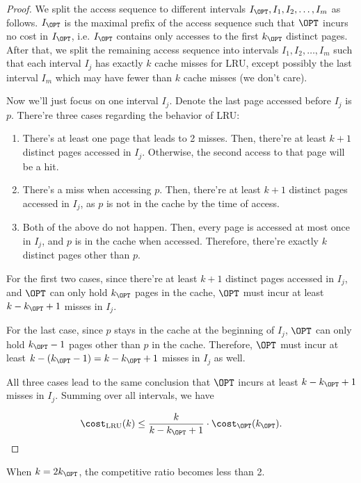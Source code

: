 \begin{proof}
	We split the access sequence to different intervals $I_\OPT, I_1, I_2, \ldots, I_m$ as follows. $I_\OPT$ is the maximal prefix of the access sequence such that $\OPT$ incurs no cost in $I_\OPT$, i.e. $I_\OPT$ contains only accesses to the first $k_{\OPT}$ distinct pages. After that, we split the remaining access sequence into intervals $I_1, I_2, \ldots, I_m$ such that each interval $I_j$ has exactly $k$ cache misses for LRU, except possibly the last interval $I_m$ which may have fewer than $k$ cache misses (we don't care).

	Now we'll just focus on one interval $I_j$. Denote the last page accessed before $I_j$ is $p$.
	There're three cases regarding the behavior of LRU:
	\begin{enumerate}
		\item There's at least one page that leads to 2 misses. Then, there're at least $k+1$ distinct pages accessed in $I_j$. Otherwise, the second access to that page will be a hit.
		\item There's a miss when accessing $p$. Then, there're at least $k+1$ distinct pages accessed in $I_j$, as $p$ is not in the cache by the time of access.
		\item Both of the above do not happen. Then, every page is accessed at most once in $I_j$, and $p$ is in the cache when accessed. Therefore, there're exactly $k$ distinct pages other than $p$.
	\end{enumerate}

	For the first two cases, since there're at least $k+1$ distinct pages accessed in $I_j$, and $\OPT$ can only hold $k_{\OPT}$ pages in the cache, $\OPT$ must incur at least $k - k_{\OPT} + 1$ misses in $I_j$.

	For the last case, since $p$ stays in the cache at the beginning of $I_j$, $\OPT$ can only hold $k_{\OPT} - 1$ pages other than $p$ in the cache. Therefore, $\OPT$ must incur at least $k - (k_{\OPT} - 1) = k - k_{\OPT} + 1$ misses in $I_j$ as well.

	All three cases lead to the same conclusion that $\OPT$ incurs at least $k - k_{\OPT} + 1$ misses in $I_j$. Summing over all intervals, we have

	\[ \cost_{\text{LRU}}(k) \leq \frac{k}{k - k_{\OPT} + 1} \cdot \cost_{\OPT}(k_{\OPT}). \]
\end{proof}

\begin{corollary}
	When $k = 2k_\OPT$, the competitive ratio becomes less than 2.
\end{corollary}
